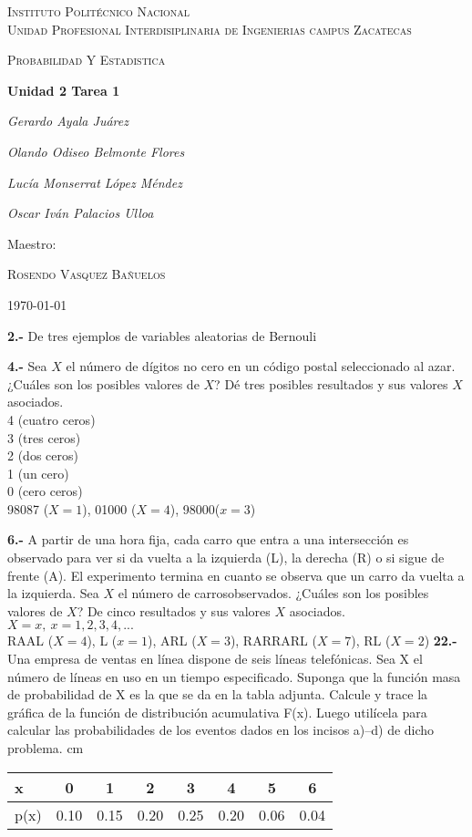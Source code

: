 \documentclass[12pt, letterpaper, spanish]{article}
\begin{document}
\begin{titlepage}
	\centering
	{\scshape\LARGE Instituto Politécnico Nacional\\ Unidad Profesional Interdisiplinaria de Ingenierias campus Zacatecas\par}
	\vspace{1cm}
	{\scshape\Large Probabilidad Y Estadistica\par}
	\vspace{1.5cm}
	{\huge\bfseries Unidad 2 Tarea 1\par}
	\vspace{2cm}
	{\Large\itshape Gerardo Ayala Juárez\par}
	{\Large\itshape Olando Odiseo Belmonte Flores\par}
	{\Large\itshape Lucía Monserrat López Méndez\par}
	{\Large\itshape Oscar Iván Palacios Ulloa\par}
	\vfill
	Maestro:\par
	\textsc{
	Rosendo Vasquez Bañuelos}
	\vfill
	{\large \today \par}
\end{titlepage}
\textbf{2.-} De tres ejemplos de variables aleatorias de Bernouli\vskip0.5cm

\textbf{4.-} Sea $X$ el número de dígitos no cero en un código postal seleccionado al azar. ¿Cuáles  son los posibles valores de $X$? Dé tres posibles resultados y sus valores $X$ asociados.\\
4 (cuatro ceros)\\
3 (tres ceros)\\
2 (dos ceros)\\
1 (un cero)\\
0 (cero ceros)\\
98087 ($X=1$), 01000 ($X=4$), 98000($x=3$) \vskip0.5cm

\textbf{6.-} A partir de una hora fija, cada carro que entra a una intersección es observado para ver si da vuelta a la izquierda (L), la derecha (R) o si sigue de frente (A). El experimento termina en cuanto se observa que un carro da vuelta a la izquierda. Sea $X$ el número de carrosobservados. ¿Cuáles son los posibles valores de $X$? De cinco resultados y sus valores $X$ asociados.\\
$X = x,\ x=1,2,3,4,...$\\
RAAL ($X=4$), L ($x=1$), ARL ($X=3$), RARRARL ($X=7$), RL ($X=2$) \vskip0.5cm
\textbf{22.-}Una empresa de ventas en línea dispone de seis líneas telefónicas. Sea X el número de líneas en uso en un tiempo especificado. Suponga que la función masa de probabilidad de X es la que se da en la tabla adjunta. Calcule y trace la gráfica de la función de distribución acumulativa F(x). Luego utilícela para calcular las probabilidades de los eventos dados en los incisos a)–d) de dicho problema.  cm
\begin{tabular}{l|c c c c c c c}
    x&0&1&2&3&4&5&6\\
    \hline
    p(x)&0.10&0.15&0.20&0.25&0.20&0.06&0.04\\
\end{tabular}\vskip0.5cm
\end{document}
